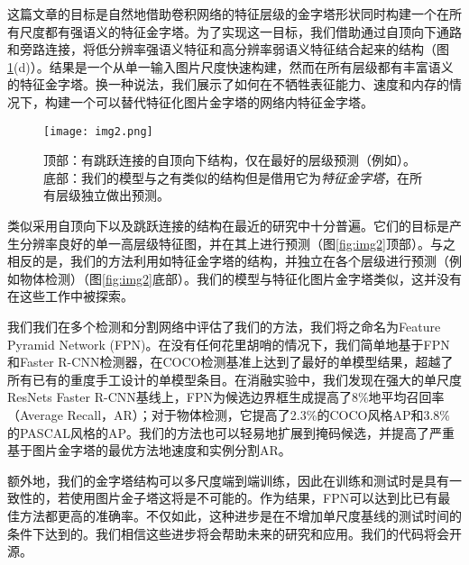 \documentclass[../main.tex]{subfile}
\begin{document}
这篇文章的目标是自然地借助卷积网络的特征层级的金字塔形状同时构建一个在所有尺度都有强语义的特征金字塔。为了实现这一目标，我们借助通过自顶向下通路和旁路连接，将低分辨率强语义特征和高分辨率弱语义特征结合起来的结构（图\ref{fig:img1}(d)）。结果是一个从单一输入图片尺度快速构建，然而在所有层级都有丰富语义的特征金字塔。换一种说法，我们展示了如何在不牺牲表征能力、速度和内存的情况下，构建一个可以替代特征化图片金字塔的网络内特征金字塔。

\begin{figure}[bh]
    \centering
    \texttt{[image: img2.png]}
    \caption{顶部：有跳跃连接的自顶向下结构，仅在最好的层级预测（例如\cite{28}）。底部：我们的模型与之有类似的结构但是借用它为\textit{特征金字塔}，在所有层级独立做出预测。}
    \label{fig:img1}
\end{figure}

类似采用自顶向下以及跳跃连接的结构在最近的研究中十分普遍。它们的目标是产生分辨率良好的单一高层级特征图，并在其上进行预测（图\ref{fig:img2}顶部）。与之相反的是，我们的方法利用如特征金字塔的结构，并独立在各个层级进行预测（例如物体检测）（图\ref{fig:img2}底部）。我们的模型与特征化图片金字塔类似，这并没有在这些工作中被探索。

我们我们在多个检测和分割网络\cite{11,29,27}中评估了我们的方法，我们将之命名为Feature Pyramid Network (FPN)。在没有任何花里胡哨的情况下，我们简单地基于FPN和Faster R-CNN检测器，在COCO检测基准上达到了最好的单模型结果，超越了所有已有的重度手工设计的单模型条目。在消融实验中，我们发现在强大的单尺度ResNets Faster R-CNN基线上，FPN为候选边界框生成提高了8\%地平均召回率（Average Recall，AR）；对于物体检测，它提高了2.3\%的COCO风格AP和3.8\%的PASCAL风格的AP。我们的方法也可以轻易地扩展到掩码候选，并提高了严重基于图片金字塔的最优方法地速度和实例分割AR。

额外地，我们的金字塔结构可以多尺度端到端训练，因此在训练和测试时是具有一致性的，若使用图片金子塔这将是不可能的。作为结果，FPN可以达到比已有最佳方法都更高的准确率。不仅如此，这种进步是在不增加单尺度基线的测试时间的条件下达到的。我们相信这些进步将会帮助未来的研究和应用。我们的代码将会开源。
\end{document}
